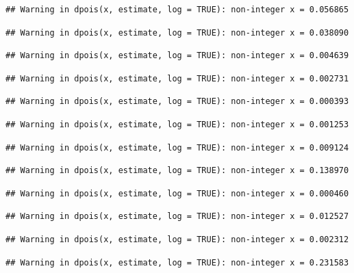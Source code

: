 \documentclass[]{article}
\begin{document}
\begin{verbatim}
## Warning in dpois(x, estimate, log = TRUE): non-integer x = 0.056865
\end{verbatim}

\begin{verbatim}
## Warning in dpois(x, estimate, log = TRUE): non-integer x = 0.038090
\end{verbatim}

\begin{verbatim}
## Warning in dpois(x, estimate, log = TRUE): non-integer x = 0.004639
\end{verbatim}

\begin{verbatim}
## Warning in dpois(x, estimate, log = TRUE): non-integer x = 0.002731
\end{verbatim}

\begin{verbatim}
## Warning in dpois(x, estimate, log = TRUE): non-integer x = 0.000393
\end{verbatim}

\begin{verbatim}
## Warning in dpois(x, estimate, log = TRUE): non-integer x = 0.001253
\end{verbatim}

\begin{verbatim}
## Warning in dpois(x, estimate, log = TRUE): non-integer x = 0.009124
\end{verbatim}

\begin{verbatim}
## Warning in dpois(x, estimate, log = TRUE): non-integer x = 0.138970
\end{verbatim}

\begin{verbatim}
## Warning in dpois(x, estimate, log = TRUE): non-integer x = 0.000460
\end{verbatim}

\begin{verbatim}
## Warning in dpois(x, estimate, log = TRUE): non-integer x = 0.012527
\end{verbatim}

\begin{verbatim}
## Warning in dpois(x, estimate, log = TRUE): non-integer x = 0.002312
\end{verbatim}

\begin{verbatim}
## Warning in dpois(x, estimate, log = TRUE): non-integer x = 0.231583
\end{verbatim}
\end{document}
